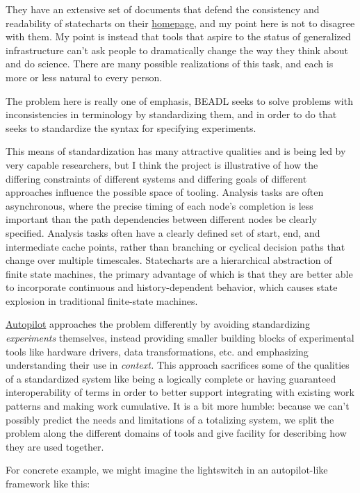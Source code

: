 \documentclass[10pt]{tufte-book}
\begin{document}
They have an extensive set of documents that defend the consistency and
readability of statecharts on their
\href{https://statecharts.dev/}{homepage}, and my point here is not to
disagree with them. My point is instead that tools that aspire to the
status of generalized infrastructure can't ask people to dramatically
change the way they think about and do science. There are many possible
realizations of this task, and each is more or less natural to every
person.

The problem here is really one of emphasis, BEADL seeks to solve
problems with inconsistencies in terminology by standardizing them, and
in order to do that seeks to standardize the syntax for specifying
experiments.

This means of standardization has many attractive qualities and is being
led by very capable researchers, but I think the project is illustrative
of how the differing constraints of different systems and differing
goals of different approaches influence the possible space of tooling.
Analysis tasks are often asynchronous, where the precise timing of each
node's completion is less important than the path dependencies between
different nodes be clearly specified. Analysis tasks often have a
clearly defined set of start, end, and intermediate cache points, rather
than branching or cyclical decision paths that change over multiple
timescales. Statecharts are a hierarchical abstraction of finite state
machines, the primary advantage of which is that they are better able to
incorporate continuous and history-dependent behavior, which causes
state explosion in traditional finite-state machines.

\href{https://docs.auto-pi-lot.com}{Autopilot} \citep{saundersAutopilotAutomatingBehavioral2019}  approaches the problem
differently by avoiding standardizing \emph{experiments} themselves,
instead providing smaller building blocks of experimental tools like
hardware drivers, data transformations, etc. and emphasizing
understanding their use in \emph{context.} This approach sacrifices some
of the qualities of a standardized system like being a logically
complete or having guaranteed interoperability of terms in order to
better support integrating with existing work patterns and making work
cumulative. It is a bit more humble: because we can't possibly predict
the needs and limitations of a totalizing system, we split the problem
along the different domains of tools and give facility for describing
how they are used together.

For concrete example, we might imagine the lightswitch in an
autopilot-like framework like this:
\end{document}
